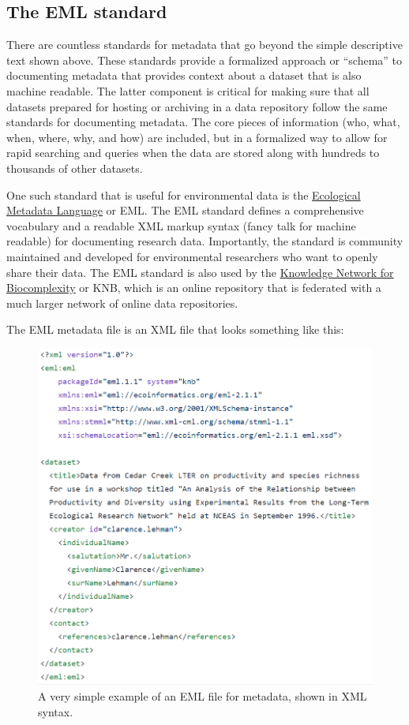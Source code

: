 \documentclass[
]{book}
\begin{document}
\subsection{The EML standard}\label{eml}

There are countless standards for metadata that go beyond the simple descriptive text shown above. These standards provide a formalized approach or ``schema'' to documenting metadata that provides context about a dataset that is also machine readable. The latter component is critical for making sure that all datasets prepared for hosting or archiving in a data repository follow the same standards for documenting metadata. The core pieces of information (who, what, when, where, why, and how) are included, but in a formalized way to allow for rapid searching and queries when the data are stored along with hundreds to thousands of other datasets.

One such standard that is useful for environmental data is the \href{https://eml.ecoinformatics.org/}{Ecological Metadata Language} or EML. The EML standard defines a comprehensive vocabulary and a readable XML markup syntax (fancy talk for machine readable) for documenting research data. Importantly, the standard is community maintained and developed for environmental researchers who want to openly share their data. The EML standard is also used by the \href{https://knb.ecoinformatics.org/}{Knowledge Network for Biocomplexity} or KNB, which is an online repository that is federated with a much larger network of online data repositories.

The EML metadata file is an XML file that looks something like this:

\begin{figure}

{\centering \includegraphics[width=0.7\linewidth]{img/emlsimple} 

}

\caption{A very simple example of an EML file for metadata, shown in XML syntax.}\label{fig:emlsimple}
\end{figure}
\end{document}

